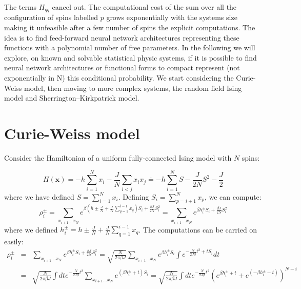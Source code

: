 \documentclass{article}
\begin{document}
The terms $H_{qq}$ cancel out.
The computational cost of the sum over all the configuration of spins labelled $p$ grows exponentially with the systems size making it unfeasible after a few number of spins the explicit computations. The idea is to find feed-forward neural network architectures representing these functions with a polynomial number of free parameters.   
In the following we will explore, on known and solvable statistical physic systems, if it is possible to find neural network architectures or functional forms to compact represent (not exponentially in N) this conditional probability. We start considering the Curie-Weiss model, then moving to more complex systems, the random field Ising model and Sherrington–Kirkpatrick model.

\section{Curie-Weiss model}

Consider the Hamiltonian of a uniform fully-connected Ising model with $N$ spins:

\begin{equation}
H\left(\mathbf{x}\right)=-h\sum_{i=1}^{N}x_{i}-\frac{J}{N}\sum_{i<j}x_{i}x_{j}
\doteq -h\sum_{i=1}^{N} S - \frac{J}{2N}S^2 - \frac{J}{2}
\end{equation}
 where we have defined $S=\sum_{i=1}^{N}x_{i}$.
Defining $S_i=\sum_{p=i+1}^{N}x_{p}$, we can compute:
\begin{equation*}
\rho_i^{\pm} = \sum_{x_{i+1}\dots 
x_{N}}e^{\beta \left(h\pm\frac{J}{N}+\frac{J}{N}\sum_{q=1}^{i-1}x_{q}\right)S_{i}+\frac{\beta J}{2N}S_{i}^{2}} = 
\sum_{x_{i+1}\dots x_{N}} e^{\beta h_i^{\pm}S_i +\frac{\beta J}{2N}S_{i}^{2}}
\end{equation*}
where we defined $h_i^{\pm} = h\pm\frac{J}{N}+\frac{J}{N}\sum_{q=1}^{i-1}x_{q}$. The computations can be carried on easily:
\begin{eqnarray*}
 \rho_i^{\pm} & = & \sum_{x_{i+1}\dots x_{N}} e^{\beta h_i^{\pm}S_i +\frac{\beta J}{2N}S_{i}^{2}}
  = \sqrt{\frac{N}{2\pi \beta J}}\sum_{x_{i+1}\dots x_{N}}e^{\beta h_i^{\pm} S_{i}}\int e^{-\frac{N}{2J \beta}t^{2}+t S_{i}} dt\\
 & = & \sqrt{\frac{N}{2\pi \beta J}}\int dt e^{-\frac{N}{2J \beta}t^{2}} \sum_{x_{i+1}\dots x_{N}}e^{(\beta h_i^{\pm} + t) S_{i}}  
 =  \sqrt{\frac{N}{2\pi \beta J}}\int dt e^{-\frac{N}{2J \beta}t^{2}} \left(e^{\beta h_i^{\pm} + t} + e^{ (-\beta h_i^{\pm} - t)} \right)^{N-i} \\
 \end{eqnarray*}
\end{document}
